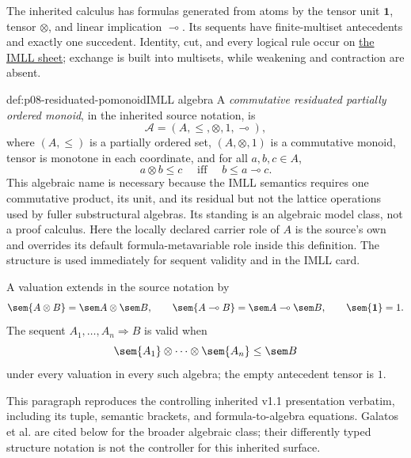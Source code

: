 The inherited calculus has formulas generated from atoms by the tensor unit
\(\mathbf 1\), tensor \(\otimes\), and linear implication
\(\multimap\).  Its sequents have finite-multiset antecedents and exactly one
succedent.  Identity, cut, and every logical rule occur on
\hyperref[sheet:imll]{the IMLL sheet}; exchange is built into multisets, while
weakening and contraction are absent.

\begin{hbdefinition}{def:p08-residuated-pomonoid}{IMLL algebra}
A \emph{commutative residuated partially ordered monoid}, in the inherited
source notation, is
\[
 \mathcal A=(A,\leq,\otimes,1,\multimap),
\]
where \((A,\leq)\) is a partially ordered set,
\((A,\otimes,1)\) is a commutative monoid, tensor is monotone in each
coordinate, and for all \(a,b,c\in A\),
\[
 a\otimes b\leq c\quad\text{ iff }\quad
 b\leq a\multimap c.
\]
This algebraic name is necessary because the IMLL semantics requires one
commutative product, its unit, and its residual but not the lattice operations
used by fuller substructural algebras.  Its standing is an algebraic model
class, not a proof calculus.  Here the locally declared carrier role of \(A\)
is the source's own and overrides its default formula-metavariable role inside
this definition.  The structure is used immediately for sequent validity and
in the IMLL card.
\end{hbdefinition}

A valuation extends in the source notation by
\[
 \sem{A\otimes B}=\sem A\otimes\sem B,
 \qquad
 \sem{A\multimap B}=\sem A\multimap\sem B,
 \qquad
 \sem{\mathbf1}=1.
\]
The sequent
\(A_1,\ldots,A_n\Rightarrow B\) is valid when
\[
 \sem{A_1}\otimes\cdots\otimes\sem{A_n}\leq\sem B
\]
under every valuation in every such algebra; the empty antecedent tensor is
\(1\).

This paragraph reproduces the controlling inherited v1.1 presentation
verbatim, including its tuple, semantic brackets, and formula-to-algebra
equations.  Galatos et al. are cited below for the broader algebraic class;
their differently typed structure notation is not the controller for this
inherited surface.

